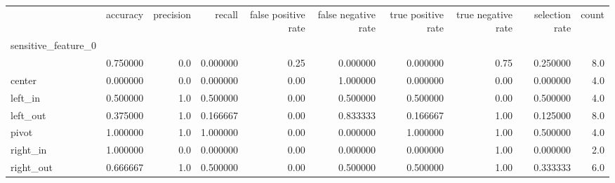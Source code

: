 \begin{tabular}{lrrrrrrrrr}
\toprule
{} &  accuracy &  precision &    recall &  false positive rate &  false negative rate &  true positive rate &  true negative rate &  selection rate &  count \\
sensitive\_feature\_0 &           &            &           &                      &                      &                     &                     &                 &        \\
\midrule
                    &  0.750000 &        0.0 &  0.000000 &                 0.25 &             0.000000 &            0.000000 &                0.75 &        0.250000 &    8.0 \\
center              &  0.000000 &        0.0 &  0.000000 &                 0.00 &             1.000000 &            0.000000 &                0.00 &        0.000000 &    4.0 \\
left\_in             &  0.500000 &        1.0 &  0.500000 &                 0.00 &             0.500000 &            0.500000 &                0.00 &        0.500000 &    4.0 \\
left\_out            &  0.375000 &        1.0 &  0.166667 &                 0.00 &             0.833333 &            0.166667 &                1.00 &        0.125000 &    8.0 \\
pivot               &  1.000000 &        1.0 &  1.000000 &                 0.00 &             0.000000 &            1.000000 &                1.00 &        0.500000 &    4.0 \\
right\_in            &  1.000000 &        0.0 &  0.000000 &                 0.00 &             0.000000 &            0.000000 &                1.00 &        0.000000 &    2.0 \\
right\_out           &  0.666667 &        1.0 &  0.500000 &                 0.00 &             0.500000 &            0.500000 &                1.00 &        0.333333 &    6.0 \\
\bottomrule
\end{tabular}
